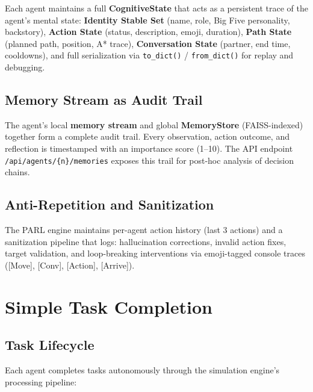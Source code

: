 \documentclass[conference]{IEEEtran}
\begin{document}
Each agent maintains a full \textbf{CognitiveState} that acts as a persistent trace of the agent's mental state: \textbf{Identity Stable Set} (name, role, Big Five personality, backstory), \textbf{Action State} (status, description, emoji, duration), \textbf{Path State} (planned path, position, A* trace), \textbf{Conversation State} (partner, end time, cooldowns), and full serialization via \texttt{to\_dict()} / \texttt{from\_dict()} for replay and debugging.

\subsection{Memory Stream as Audit Trail}

The agent's local \textbf{memory stream} and global \textbf{MemoryStore} (FAISS-indexed) together form a complete audit trail. Every observation, action outcome, and reflection is timestamped with an importance score (1--10). The API endpoint \texttt{/api/agents/\{n\}/memories} exposes this trail for post-hoc analysis of decision chains.

\subsection{Anti-Repetition and Sanitization}

The PARL engine maintains per-agent action history (last 3 actions) and a sanitization pipeline that logs: hallucination corrections, invalid action fixes, target validation, and loop-breaking interventions via emoji-tagged console traces ([Move], [Conv], [Action], [Arrive]).

\section{Simple Task Completion}

\subsection{Task Lifecycle}

Each agent completes tasks autonomously through the simulation engine's processing pipeline:
\end{document}
